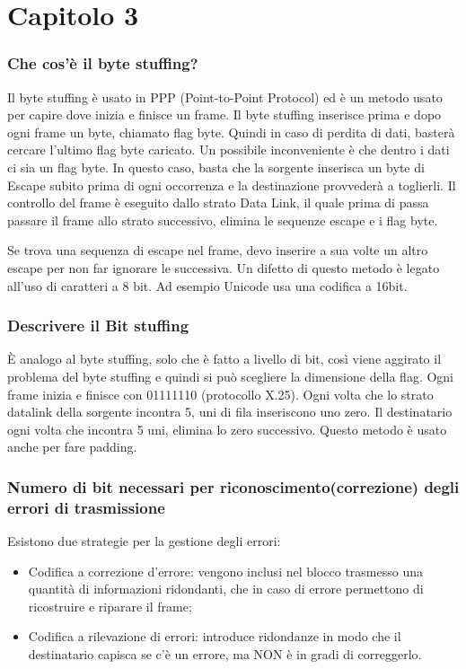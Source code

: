 \section{Capitolo 3}

\subsubsection{Che cos'è il byte stuffing?}

Il byte stuffing è usato in PPP (Point-to-Point Protocol) ed è un metodo usato per capire dove inizia e finisce un frame. Il byte stuffing inserisce prima e dopo ogni frame un byte, chiamato flag byte.
Quindi in caso di perdita di dati, basterà cercare l'ultimo flag byte caricato. Un possibile
inconveniente è che dentro i dati ci sia un flag byte. In questo caso, basta che la sorgente inserisca un byte di Escape subito prima di ogni occorrenza e la destinazione provvederà a toglierli.
Il controllo del frame è eseguito dallo strato Data Link, il quale prima di passa passare il frame allo strato successivo, elimina le sequenze escape e i flag byte.

Se trova una sequenza di escape nel frame, devo inserire a sua volte un altro escape per non far
ignorare le successiva. Un difetto di questo metodo è legato all’uso di caratteri a 8 bit. Ad esempio Unicode usa una codifica a 16bit.

\subsubsection{Descrivere il Bit stuffing}

È analogo al byte stuffing, solo che è fatto a livello di bit, così viene aggirato il problema del byte stuffing e quindi si può scegliere la dimensione della flag. Ogni frame inizia e finisce con 01111110 (protocollo X.25). Ogni volta che lo strato datalink della sorgente incontra 5, uni di fila inseriscono uno zero. Il destinatario ogni volta che incontra 5 uni, elimina lo zero successivo. Questo metodo è usato anche per fare padding.

\subsubsection{Numero di bit necessari per riconoscimento(correzione) degli errori di trasmissione}

Esistono due strategie per la gestione degli errori:

\begin{itemize}

\item Codifica a correzione d’errore: vengono inclusi nel blocco trasmesso una quantità di
informazioni ridondanti, che in caso di errore permettono di ricostruire e riparare il frame;
\item Codifica a rilevazione di errori: introduce ridondanze in modo che il destinatario capisca se
c’è un errore, ma NON è in gradi di correggerlo.

\end{itemize}

